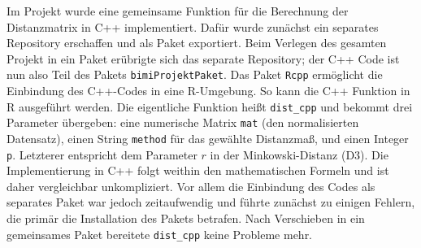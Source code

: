 \documentclass[12pt]{article}
\begin{document}
Im Projekt wurde eine gemeinsame Funktion für die Berechnung der Distanzmatrix in C++ implementiert. Dafür wurde zunächst ein separates Repository erschaffen und als Paket exportiert. Beim Verlegen des gesamten Projekt in ein Paket erübrigte sich das separate Repository; der C++ Code ist nun also Teil des Pakets \verb*|bimiProjektPaket|. Das Paket \verb*|Rcpp| \cite{Eddelbuettel2026} ermöglicht die Einbindung des C++-Codes in eine R-Umgebung. So kann die C++ Funktion in R ausgeführt werden. Die eigentliche Funktion heißt \verb*|dist_cpp| und bekommt drei Parameter übergeben: eine numerische Matrix \verb*|mat| (den normalisierten Datensatz), einen String \verb*|method| für das gewählte Distanzmaß, und einen Integer \verb*|p|. Letzterer entspricht dem Parameter \(r\) in der Minkowski-Distanz (D3). Die Implementierung in C++ folgt weithin den mathematischen Formeln und ist daher vergleichbar unkompliziert. Vor allem die Einbindung des Codes als separates Paket war jedoch zeitaufwendig und führte zunächst zu einigen Fehlern, die primär die Installation des Pakets betrafen. Nach Verschieben in ein gemeinsames Paket bereitete \verb*|dist_cpp| keine Probleme mehr. 
\end{document}
